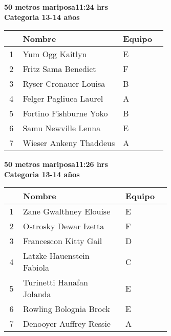 \begin{minipage}{0.95\linewidth}\vspace{0.5cm} 
\begin{flushleft}
\textbf{
\hspace{-0.15cm}50 metros mariposa\hspace{1.5cm}11:24 hrs \\Categoria 13-14 años}\vspace{-0.2cm} 
\end{flushleft}
\begin{tabular}{cp{0.63\linewidth}l}
\hline
& \textbf{Nombre} & \textbf{Equipo} \\ \hline
1 & Yum Ogg Kaitlyn & E \\ 
2 & Fritz Sama Benedict & F \\ 
3 & Ryser Cronauer Louisa & B \\ 
4 & Felger Pagliuca Laurel & A \\ 
5 & Fortino Fishburne Yoko & B \\ 
6 & Samu Newville Lenna & E \\ 
7 & Wieser Ankeny Thaddeus & A \\ 
\end{tabular}
\end{minipage}
\begin{minipage}{0.95\linewidth}\vspace{0.5cm} 
\begin{flushleft}
\textbf{
\hspace{-0.15cm}50 metros mariposa\hspace{1.5cm}11:26 hrs \\Categoria 13-14 años}\vspace{-0.2cm} 
\end{flushleft}
\begin{tabular}{cp{0.63\linewidth}l}
\hline
& \textbf{Nombre} & \textbf{Equipo} \\ \hline
1 & Zane Gwalthney Elouise & E \\ 
2 & Ostrosky Dewar Izetta & F \\ 
3 & Francescon Kitty Gail & D \\ 
4 & Latzke Hauenstein Fabiola & C \\ 
5 & Turinetti Hanafan Jolanda & E \\ 
6 & Rowling Bolognia Brock & E \\ 
7 & Denooyer Auffrey Ressie & A \\ 
\end{tabular}
\end{minipage}
